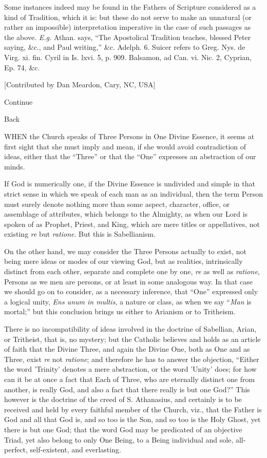 Some instances indeed may be found in the Fathers
of Scripture considered as a kind of Tradition, which it is: but these
do not serve to make an unnatural (or rather an impossible)
interpretation imperative in the case of such passages as the above. \emph{E.g.}
Athan. says, ``The Apostolical Tradition teaches, blessed Peter saying,
\&c., and Paul writing,'' \&c. Adelph. 6. Suicer refers to Greg.
Nys. de Virg. xi. fin. Cyril in Is. lxvi. 5, p. 909. Balsamon, ad Can.
vi. Nic. 2, Cyprian, Ep. 74, \&c.

[Contributed by Dan Meardon, Cary, NC, USA]

Continue

Back


WHEN the Church speaks of Three Persons in One Divine Essence, it
seems at first sight that she must imply and mean, if she would avoid
contradiction of ideas, either that the ``Three'' or that the ``One''
expresses an abstraction of our minds.

If God is numerically one, if the Divine Essence
is undivided and simple in that strict sense in which we speak of each
man as an individual, then the term Person must surely denote nothing
more than some aspect, character, office, or assemblage of attributes,
which belongs to the Almighty, as when our Lord is spoken of as
Prophet, Priest, and King, which are mere titles or appellatives, not
existing \emph{re} but \emph{ratione}. But this is Sabellianism.

On the other hand, we may consider the Three
Persons actually to exist, not being mere ideas or modes of our
viewing God, but as realities, intrinsically distinct from each other,
separate and complete one by one, \emph{re} as well as \emph{ratione},
Persons as we men are persons, or at least in some analogous way. In
that case we should go on to consider, as a necessary inference, that ``One''
expressed only a logical unity, \emph{Ens unum in multis}, a nature or
class, as when we say ``\emph{Man} is mortal;'' but this conclusion
brings us either to Arianism or to Tritheism.

There is no incompatibility of ideas involved in
the doctrine of Sabellian, Arian, or Tritheist, that is, no mystery;
but the Catholic believes and holds as an article of faith that the
Divine Three, and again the Divine One, both as One and as Three,
exist \emph{re} not \emph{ratione}; and therefore he has to answer the
objection, ``Either the word 'Trinity' denotes a mere abstraction, or
the word 'Unity' does; for how can it be at once a fact that Each of
Three, who are eternally distinct one from another, is really God, and
also a fact that there really is but one God?'' This however is the
doctrine of the creed of S. Athanasius, and certainly is to be
received and held by every faithful member of the Church, viz., that
the Father is God and all that God is, and so too is the Son, and so
too is the Holy Ghost, yet there is but one God; that the word God may
be predicated of an objective Triad, yet also belong to only One
Being, to a Being individual and sole, all-perfect, self-existent, and
everlasting.

